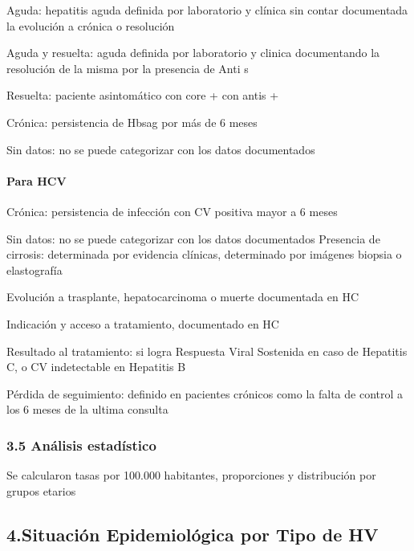 \documentclass[
  letterpaper,
  DIV=11,
  numbers=noendperiod]{scrartcl}
\let\oldparagraph\paragraph
\renewcommand{\paragraph}[1]{\oldparagraph{#1}\mbox{}}
\begin{document}
Aguda: hepatitis aguda definida por laboratorio y clínica sin contar
documentada la evolución a crónica o resolución

Aguda y resuelta: aguda definida por laboratorio y clinica documentando
la resolución de la misma por la presencia de Anti s

Resuelta: paciente asintomático con core + con antis +

Crónica: persistencia de Hbsag por más de 6 meses

Sin datos: no se puede categorizar con los datos documentados

\hypertarget{para-hcv}{%
\paragraph{Para HCV}\label{para-hcv}}

Crónica: persistencia de infección con CV positiva mayor a 6 meses

Sin datos: no se puede categorizar con los datos documentados Presencia
de cirrosis: determinada por evidencia clínicas, determinado por
imágenes biopsia o elastografía

Evolución a trasplante, hepatocarcinoma o muerte documentada en HC

Indicación y acceso a tratamiento, documentado en HC

Resultado al tratamiento: si logra Respuesta Viral Sostenida en caso de
Hepatitis C, o CV indetectable en Hepatitis B

Pérdida de seguimiento: definido en pacientes crónicos como la falta de
control a los 6 meses de la ultima consulta

\hypertarget{anuxe1lisis-estaduxedstico}{%
\subsubsection{3.5 Análisis
estadístico}\label{anuxe1lisis-estaduxedstico}}

Se calcularon tasas por 100.000 habitantes, proporciones y distribución
por grupos etarios

\hypertarget{situaciuxf3n-epidemioluxf3gica-por-tipo-de-hv}{%
\subsection{\texorpdfstring{\textbf{4.Situación Epidemiológica por Tipo
de
HV}}{4.Situación Epidemiológica por Tipo de HV}}\label{situaciuxf3n-epidemioluxf3gica-por-tipo-de-hv}}
\end{document}
